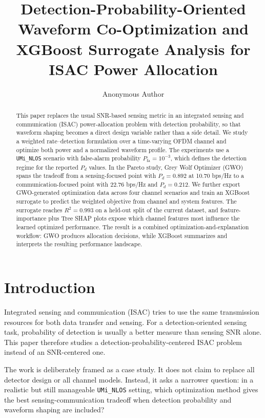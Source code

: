 \documentclass[runningheads]{llncs}
\title{Detection-Probability-Oriented Waveform Co-Optimization and XGBoost Surrogate Analysis for ISAC Power Allocation}
\author{Anonymous Author}
\institute{Prepared from the ISAC Power Allocation project repository}
\begin{document}
\maketitle

\begin{abstract}
This paper replaces the usual SNR-based sensing metric in an integrated sensing and communication (ISAC) power-allocation problem with detection probability, so that waveform shaping becomes a direct design variable rather than a side detail. We study a weighted rate--detection formulation over a time-varying OFDM channel and optimize both power and a normalized waveform profile. The experiments use a \texttt{UMi\_NLOS} scenario with false-alarm probability $P_{\mathrm{fa}}=10^{-3}$, which defines the detection regime for the reported $P_d$ values. In the Pareto study, Grey Wolf Optimizer (GWO) spans the tradeoff from a sensing-focused point with $P_d=0.892$ at 10.70 bps/Hz to a communication-focused point with 22.76 bps/Hz and $P_d=0.212$. We further export GWO-generated optimization data across four channel scenarios and train an XGBoost surrogate to predict the weighted objective from channel and system features. The surrogate reaches $R^2=0.993$ on a held-out split of the current dataset, and feature-importance plus Tree SHAP plots expose which channel features most influence the learned optimized performance. The result is a combined optimization-and-explanation workflow: GWO produces allocation decisions, while XGBoost summarizes and interprets the resulting performance landscape.
\end{abstract}

\section{Introduction}
Integrated sensing and communication (ISAC) tries to use the same transmission resources for both data transfer and sensing. For a detection-oriented sensing task, probability of detection is usually a better measure than sensing SNR alone. This paper therefore studies a detection-probability-centered ISAC problem instead of an SNR-centered one.

The work is deliberately framed as a case study. It does not claim to replace all detector design or all channel models. Instead, it asks a narrower question: in a realistic but still manageable \texttt{UMi\_NLOS} setting, which optimization method gives the best sensing-communication tradeoff when detection probability and waveform shaping are included?
\end{document}
